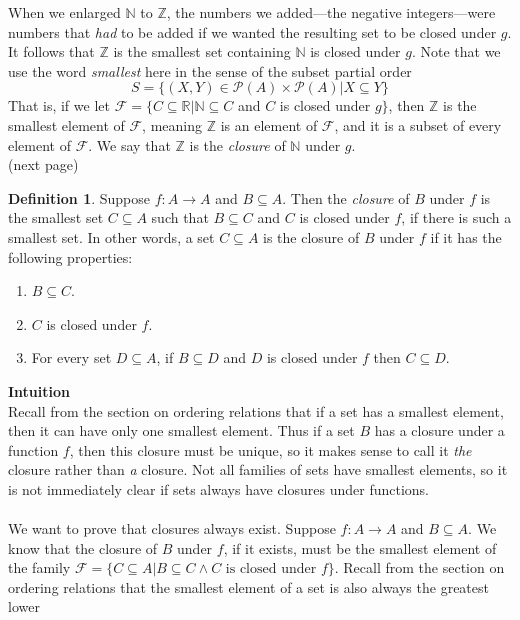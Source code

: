 \documentclass{report}
\theoremstyle{definition}
\newtheorem*{definition}{Definition}
\begin{document}
When we enlarged $\mathbb N$ to $\mathbb Z$, the numbers we added---the negative integers---were numbers that \textit{had} to be added if we wanted the resulting set to be closed under $g$. 
It follows that $\mathbb Z$ is the smallest set containing $\mathbb N$ is closed under $g$. Note that we use the word \textit{smallest} here in the sense of the subset partial order
\begin{equation*}
S=\{(X,Y)\in\mathscr P(A)\times\mathscr P(A)|X\subseteq Y\}
\end{equation*}
That is, if we let $\mathcal F=\{C\subseteq\mathbb R|\mathbb N\subseteq C$ and $C$ is closed under $g\}$, then $\mathbb Z$ is the smallest element of $\mathcal F$, meaning 
$\mathbb Z$ is an element of $\mathcal F$, and it is a subset of every element of $\mathcal F$. We say that $\mathbb Z$ is the \textit{closure} of $\mathbb N$ under $g$.\\
(next page)
\newpage
\begin{definition}
Suppose $f:A\to A$ and $B\subseteq A$. Then the \textit{closure} of $B$ under $f$ is the smallest set $C\subseteq A$ such that $B\subseteq C$ and $C$ is closed under $f$, if there
is such a smallest set. In other words, a set $C\subseteq A$ is the closure of $B$ under $f$ if it has the following properties:
\begin{enumerate}
\item $B\subseteq C$.
\item $C$ is closed under $f$.
\item For every set $D\subseteq A$, if $B\subseteq D$ and $D$ is closed under $f$ then $C\subseteq D$.
\end{enumerate}
\end{definition}
\noindent\textbf{Intuition}\\
Recall from the section on ordering relations that if a set has a smallest element, then it can have only one smallest element. Thus if a set $B$ has a closure under a function $f$, then this 
closure must be unique, so it makes sense to call it \textit{the} closure rather than \textit{a} closure. Not all families of sets have smallest elements, so it is not immediately clear 
if sets always have closures under functions.\\
\vspace{1mm}\\
We want to prove that closures always exist. Suppose $f:A\to A$ and $B\subseteq A$. We know that the closure of $B$ under $f$, if it exists, must be the smallest element of the family 
$\mathcal F=\{C\subseteq A|B\subseteq C\land C\text{ is closed under }f\}$. Recall from the section on ordering relations that the smallest element of a set is also always the greatest lower 
\end{document}
